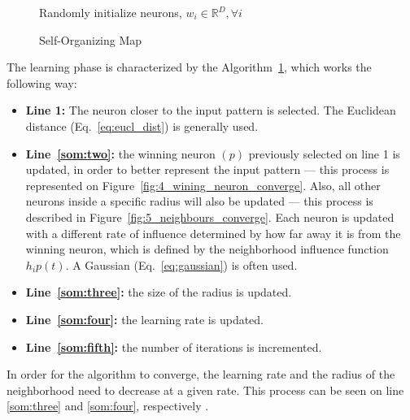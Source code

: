 \begin{figure}[h]
  \begin{algorithm}[H]
    \label{alg:som}
    \DontPrintSemicolon
    Randomly initialize neurons, $w_i \in \mathbb{R}^{D}, \forall i $ \;
      \caption{Self-Organizing Map \cite[]{Kohonen1990} }
  \end{algorithm}
\end{figure}

The learning phase is characterized by the Algorithm~\ref{alg:som}, which works the following way:
\begin{itemize}
  \item \textbf{Line 1:} The neuron closer to the input pattern is selected. The Euclidean distance (Eq.~\ref{eq:eucl_dist}) is generally used.
    
  \item \textbf{Line~\ref{som:two}:} the winning neuron $(p)$ previously selected on line 1 is updated, in order to better represent the input pattern --- this process is represented on Figure~\ref{fig:4_wining_neuron_converge}. Also, all other neurons inside a specific radius will also be updated --- this process is described in Figure~\ref{fig:5_neighbours_converge}. Each neuron is updated with a different rate of influence determined by how far away it is from the winning neuron, which is defined by the neighborhood influence function $h_ip(t)$. A Gaussian (Eq.~\ref{eq:gaussian}) is often used. 
    
  \item \textbf{Line~\ref{som:three}:} the size of the radius is updated.
  \item \textbf{Line~\ref{som:four}:} the learning rate is updated.
  \item \textbf{Line~\ref{som:fifth}:} the number of iterations is incremented.
\end{itemize}
 
In order for the algorithm to converge, the learning rate and the radius of the neighborhood need to decrease at a given rate. This process can be seen on line \ref{som:three} and \ref{som:four}, respectively .
